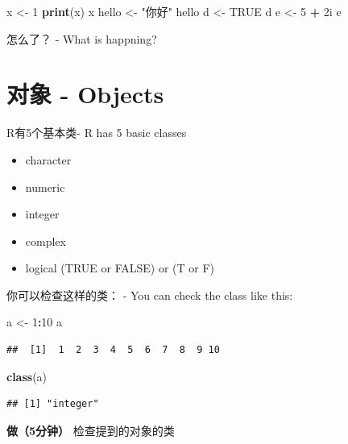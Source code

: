\documentclass[]{book}
\newenvironment{Shaded}{\begin{snugshade}}{\end{snugshade}}
\newcommand{\DecValTok}[1]{\textcolor[rgb]{0.00,0.00,0.81}{#1}}
\newcommand{\KeywordTok}[1]{\textcolor[rgb]{0.13,0.29,0.53}{\textbf{#1}}}
\newcommand{\NormalTok}[1]{#1}
\newcommand{\OperatorTok}[1]{\textcolor[rgb]{0.81,0.36,0.00}{\textbf{#1}}}
\newcommand{\OtherTok}[1]{\textcolor[rgb]{0.56,0.35,0.01}{#1}}
\newcommand{\StringTok}[1]{\textcolor[rgb]{0.31,0.60,0.02}{#1}}
\providecommand{\tightlist}{%
  \setlength{\itemsep}{0pt}\setlength{\parskip}{0pt}}
\begin{document}
\begin{Shaded}
\begin{Highlighting}[]
\NormalTok{x <-}\StringTok{ }\DecValTok{1}
\KeywordTok{print}\NormalTok{(x)}
\NormalTok{x}
\NormalTok{hello <-}\StringTok{ "你好"}
\NormalTok{hello}
\NormalTok{d <-}\StringTok{ }\OtherTok{TRUE}
\NormalTok{d}
\NormalTok{e <-}\StringTok{ }\DecValTok{5} \OperatorTok{+}\StringTok{ }\NormalTok{2i}
\NormalTok{e}
\end{Highlighting}
\end{Shaded}

怎么了？ - What is happning?

\hypertarget{objects}{%
\section{对象 - Objects}\label{objects}}

R有5个基本类- R has 5 basic classes

\begin{itemize}
\tightlist
\item
  character
\item
  numeric
\item
  integer
\item
  complex
\item
  logical (TRUE or FALSE) or (T or F)
\end{itemize}

你可以检查这样的类： - You can check the class like this:

\begin{Shaded}
\begin{Highlighting}[]
\NormalTok{a <-}\StringTok{ }\DecValTok{1}\OperatorTok{:}\DecValTok{10}
\NormalTok{a}
\end{Highlighting}
\end{Shaded}

\begin{verbatim}
##  [1]  1  2  3  4  5  6  7  8  9 10
\end{verbatim}

\begin{Shaded}
\begin{Highlighting}[]
\KeywordTok{class}\NormalTok{(a)}
\end{Highlighting}
\end{Shaded}

\begin{verbatim}
## [1] "integer"
\end{verbatim}

\textbf{做（5分钟）}
检查提到的对象的类
\end{document}
